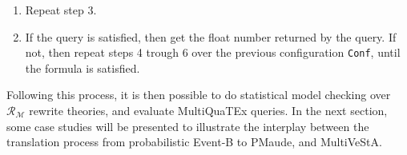 \begin{enumerate}
\begin{enumerate}
\begin{maude}
{gt' | nilSL }             $\xrightarrow{chooseEvt}$      scheduleEvent({gt' | nilSL } 
{$\mathfrak{C} \ \mathfrak{M}_{j} \ \mathfrak{E}$ randomCounter(n)}              {$\mathfrak{C} \ \mathfrak{M}_{j} \ \mathfrak{E'}$ randomCounter(n+1)})\end{maude}
where $\mathfrak{E'} = \texttt{<events:Events|state:(ev(ruleQid,execute))}$.

        \item Maude reduces the terms:
        \begin{maude}
        
scheduleEvent({gt' | nilSL }  $\rightarrow$   {gt' | [gt' + 1.0 , $MG$]}   
{$\mathfrak{C} \ \mathfrak{M}_{j} \ \mathfrak{E'}$ randomCounter(n+1)})      {$\mathfrak{C} \ \mathfrak{M}_{j} \ \mathfrak{E'}$ randomCounter(n+1)})\end{maude}
    \end{enumerate}

    \item Repeat step 3.
    
    \item If the query is satisfied, then get the float number returned by the query. If not, then repeat steps 4 trough 6 over the previous configuration \texttt{Conf}, until the formula is satisfied.
\end{enumerate}
Following this process, it is then possible to do statistical model checking over $\mathscr{R}_\mathscr{M}$ rewrite theories, and evaluate MultiQuaTEx queries. In the next section, some case studies will be presented to illustrate the interplay between the translation process from probabilistic Event-B to PMaude, and MultiVeStA.
















